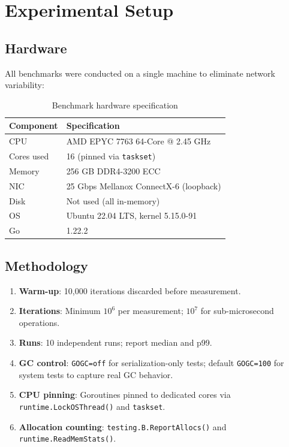 \section{Experimental Setup}


\subsection{Hardware}

All benchmarks were conducted on a single machine to eliminate network variability:

\begin{table}[h]
\centering
\caption{Benchmark hardware specification}
\begin{tabular}{ll}
\toprule
\textbf{Component} & \textbf{Specification} \\
\midrule
CPU & AMD EPYC 7763 64-Core @ 2.45 GHz \\
Cores used & 16 (pinned via \texttt{taskset}) \\
Memory & 256 GB DDR4-3200 ECC \\
NIC & 25 Gbps Mellanox ConnectX-6 (loopback) \\
Disk & Not used (all in-memory) \\
OS & Ubuntu 22.04 LTS, kernel 5.15.0-91 \\
Go & 1.22.2 \\
\bottomrule
\end{tabular}
\end{table}

\subsection{Methodology}

\begin{enumerate}
\item \textbf{Warm-up}: 10,000 iterations discarded before measurement.
\item \textbf{Iterations}: Minimum $10^6$ per measurement; $10^7$ for sub-microsecond operations.
\item \textbf{Runs}: 10 independent runs; report median and p99.
\item \textbf{GC control}: \texttt{GOGC=off} for serialization-only tests; default \texttt{GOGC=100} for system tests to capture real GC behavior.
\item \textbf{CPU pinning}: Goroutines pinned to dedicated cores via \texttt{runtime.LockOSThread()} and \texttt{taskset}.
\item \textbf{Allocation counting}: \texttt{testing.B.ReportAllocs()} and \texttt{runtime.ReadMemStats()}.
\end{enumerate}

